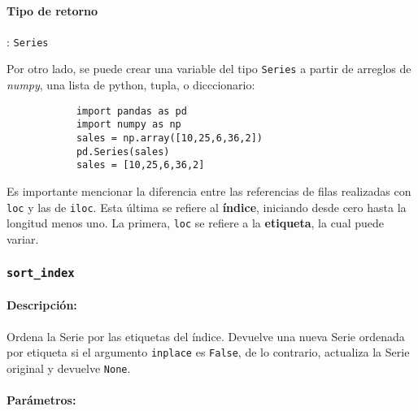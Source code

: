     \paragraph{Tipo de retorno}: \texttt{Series}


    Por otro lado, se puede crear una variable del tipo \texttt{Series} a partir de arreglos de \textit{numpy}, una lista de python, tupla, o dicccionario:

    \begin{verbatim}
            import pandas as pd
            import numpy as np
            sales = np.array([10,25,6,36,2])
            pd.Series(sales)
            sales = [10,25,6,36,2]
            \end{verbatim}
    Es importante mencionar la diferencia entre las referencias de filas realizadas con \texttt{loc} y las de \texttt{iloc}. Esta última se refiere al \textbf{índice}, iniciando desde cero hasta la longitud menos uno. La primera, \texttt{loc} se refiere a la \textbf{etiqueta}, la cual puede variar.

    \subsubsection{\texttt{sort\_index}}

    \paragraph{Descripción:}
    Ordena la Serie por las etiquetas del índice. Devuelve una nueva Serie ordenada por etiqueta si el argumento \texttt{inplace} es \texttt{False}, de lo contrario, actualiza la Serie original y devuelve \texttt{None}.

    \paragraph{Parámetros:}

